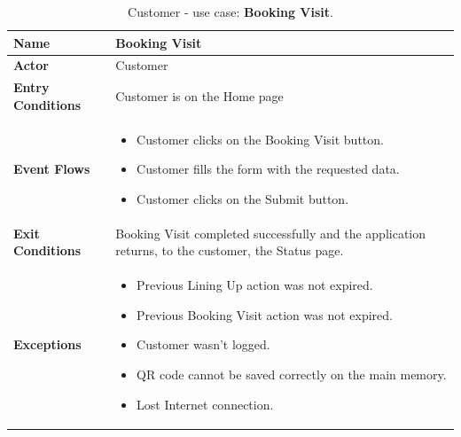 \begin{table}[h!]
\centering
\begin{tabular}{| m{} | m{} |} 
	\hline
	\textbf{Name} & Booking Visit \\ 
	\hline
	\textbf{Actor} & Customer \\ 
	\hline
	\textbf{Entry Conditions} & Customer is on the Home page \\ 
	\hline
	\textbf{Event Flows} &
	\begin{itemize}
	\item Customer clicks on the Booking Visit button.
	\item Customer fills the form with the requested data.
	\item Customer clicks on the Submit button.
	\end{itemize} \\ 
	\hline
	\textbf{Exit Conditions} & Booking Visit completed successfully and the application returns, to the customer, the Status page. \\ 
	\hline
	\textbf{Exceptions} &
	\begin{itemize}
	\item Previous Lining Up action was not expired.
	\item Previous Booking Visit action was not expired.
	\item Customer wasn't logged.
	\item QR code cannot be saved correctly on the main memory.
	\item Lost Internet connection.
	\end{itemize} \\ 
	\hline
\end{tabular}
\caption{Customer - use case: \textbf{Booking Visit}.}
\label{tableLogIn}
\end{table}

